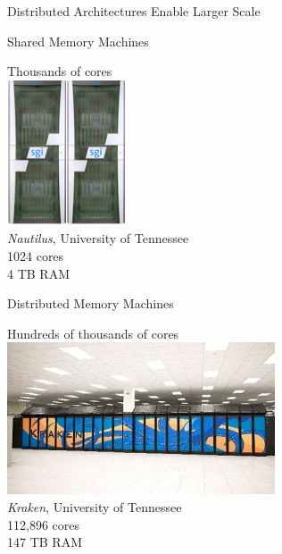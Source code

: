 \begin{frame}{Distributed Architectures Enable Larger Scale}
   \begin{center}
    \begin{minipage}[t]{.47\textwidth}
    \begin{block}{Shared Memory Machines}
    \begin{center}
    Thousands of cores\\[.2cm]
    \includegraphics[scale=.65]{../common/pics/nautilus}\\
    {\tiny \emph{Nautilus}, University of Tennessee\\1024 cores \\4 TB RAM\\}
    \end{center}
    \end{block}
    \end{minipage}
    \hspace{.1cm}
    \begin{minipage}[t]{.47\textwidth}
    \begin{block}{Distributed Memory Machines}
    \begin{center}
    Hundreds of thousands of cores\\[.2cm]
    \includegraphics[width=.95\textwidth]{../common/pics/kraken}\\
    {\tiny \emph{Kraken}, University of Tennessee\\ 112,896 cores \\147 TB 
RAM\\}
    \end{center}
    \end{block}
    \end{minipage}
    \end{center}
\end{frame}

